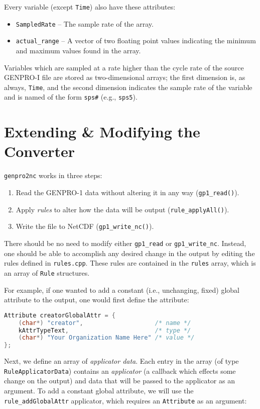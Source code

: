 \documentclass{report}
\begin{document}
Every variable (except \texttt{Time}) also have these attributes:
\begin{itemize}[noitemsep]
	\item \texttt{SampledRate} -- The sample rate of the array.
	\item \texttt{actual\_range} -- A vector of two floating point values indicating the minimum and maximum values found in the array.
\end{itemize}

Variables which are sampled at a rate higher than the cycle rate of the source GENPRO-I file are stored as two-dimensional arrays; the first dimension is, as always, \texttt{Time}, and the second dimension indicates the sample rate of the variable and is named of the form \texttt{sps\#} (e.g., \texttt{sps5}).

\section{Extending \& Modifying the Converter} \label{Sec.Extending}

\texttt{genpro2nc} works in three steps:
\begin{enumerate}[noitemsep]
	\item Read the GENPRO-1 data without altering it in any way (\texttt{gp1\_read()}).
	\item Apply \textit{rules} to alter how the data will be output (\texttt{rule\_applyAll()}).
	\item Write the file to NetCDF (\texttt{gp1\_write\_nc()}).
\end{enumerate}

There should be no need to modify either \texttt{gp1\_read} or \texttt{gp1\_write\_nc}. Instead, one should be able to accomplish any desired change in the output by editing the rules defined in \texttt{rules.cpp}. These rules are contained in the \texttt{rules} array, which is an array of \texttt{Rule} structures.

For example, if one wanted to add a constant (i.e., unchanging, fixed) global attribute to the output, one would first define the attribute:
\begin{lstlisting}[language=c]
Attribute creatorGlobalAttr = {
	(char*) "creator",                    /* name */
	kAttrTypeText,                        /* type */
	(char*) "Your Organization Name Here" /* value */
};
\end{lstlisting}

Next, we define an array of \textit{applicator data}. Each entry in the array (of type \texttt{RuleApplicatorData}) contains an \textit{applicator} (a callback which effects some change on the output) and data that will be passed to the applicator as an argument. To add a constant global attribute, we will use the \texttt{rule\_addGlobalAttr} applicator, which requires an \texttt{Attribute} as an argument:
\end{document}
